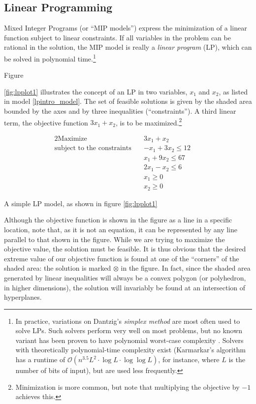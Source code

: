 \documentclass[13pt, letterpaper, oneside]{book}
\begin{document}
\subsection{Linear Programming}
Mixed Integer Programs (or ``MIP
models'') express the minimization of a linear function subject to linear
constraints. If all variables in the problem can be rational in the solution,
the MIP model is really a \textit{linear program} (LP), which can be solved in
polynomial time.\footnote{In practice, variations on Dantzig's \textit{simplex
method} are most often used to solve LPs. Such solvers perform very well on most
problems, but no known variant has been proven to have polynomial worst-case
complexity \citep{papadimitriou}. Solvers with theoretically polynomial-time
complexity exist (Karmarkar's algorithm \citet{karmarkar} has a runtime of
$\mathcal{O}(n^{3.5}L^2 \cdot \log L \cdot \log \log L)$, for instance, where
$L$ is the number of bits of input), but are used less frequently.}

Figure

\ref{fig:lpplot1} illustrates the concept of an LP in two variables, $x_1$ and
$x_2$, as listed in model \ref{lpintro_model}. The set of feasible solutions is given by the shaded area bounded by the axes
and by three inequalities (``constraints''). A third linear term, the objective
function $3x_1 + x_2$, is to be maximized.\footnote{Minimization is more common,
but note that multiplying the objective by $-1$ achieves this.} 
\begin{model}
\begin{alignat}{2}
\text{Maximize}\quad & 3x_1 + x_2 && \\
\text{subject to the constraints}\quad & -x_1 + 3x_2 \leq 12 &&\\
& x_1 + 9x_2 \leq 67 && \\
& 2x_1 - x_2 \leq 6 && \\
& x_1 \geq 0 && \\
& x_2 \geq 0 && 
\end{alignat}
\caption{A simple LP model, as shown in figure \ref{fig:lpplot1}}
\label{lpintro_model}
\end{model}

Although the objective function is shown in the figure as a line in a specific
location, note that, as it is not an equation, it can be represented by any line
parallel to that shown in the figure. While we are trying to maximize the
objective value, the solution must be feasible. It is thus obvious
that the desired extreme value of our objective function is found at one of the
``corners'' of the shaded area: the solution is marked $\otimes$ in the figure.
In fact, since the shaded area generated by linear inequalities will always be a
convex polygon (or polyhedron, in higher dimensions), the solution will
invariably be found at an intersection of hyperplanes.
\end{document}
